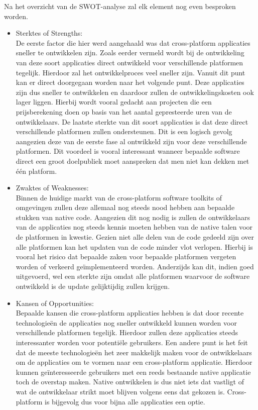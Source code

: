 Na het overzicht van de SWOT-analyse zal elk element nog even besproken worden. 
\begin{itemize}
    \item Sterktes of Strengths:\\
    De eerste factor die hier werd aangehaald was dat cross-platform applicaties sneller te ontwikkelen zijn. Zoals eerder vermeld wordt bij de ontwikkeling van deze soort applicaties direct ontwikkeld voor verschillende platformen tegelijk. Hierdoor zal het ontwikkelproces veel sneller zijn. Vanuit dit punt kan er direct doorgegaan worden naar het volgende punt. Deze applicaties zijn dus sneller te ontwikkelen en daardoor zullen de ontwikkelingskosten ook lager liggen. Hierbij wordt vooral gedacht aan projecten die een prijsberekening doen op basis van het aantal gepresteerde uren van de ontwikkelaars. De laatste sterkte van dit soort applicaties is dat deze direct verschillende platformen zullen ondersteunen. Dit is een logisch gevolg aangezien deze van de eerste fase al ontwikkeld zijn voor deze verschillende platformen. Dit voordeel is vooral interessant wanneer bepaalde software direct een groot doelpubliek moet aanspreken dat men niet kan dekken met één platform.
    \\
    
    \item Zwaktes of Weaknesses:\\
    Binnen de huidige markt van de cross-platform software toolkits of omgevingen zullen deze allemaal nog steeds nood hebben aan bepaalde stukken van native code. Aangezien dit nog nodig is zullen de ontwikkelaars van de applicaties nog steeds kennis moeten hebben van de native talen voor de platformen in kwestie. Gezien niet alle delen van de code gedeeld zijn over alle platformen kan het updaten van de code minder vlot verlopen. Hierbij is vooral het risico dat bepaalde zaken voor bepaalde platformen vergeten worden of verkeerd geïmplementeerd worden. Anderzijds kan dit, indien goed uitgevoerd, wel een sterkte zijn omdat alle platformen waarvoor de software ontwikkeld is de update gelijktijdig zullen krijgen.
    \\
    
    \item Kansen of Opportunities:\\
    Bepaalde kansen die cross-platform applicaties hebben is dat door recente technologieën de applicaties nog sneller ontwikkeld kunnen worden voor verschillende platformen tegelijk. Hierdoor zullen deze applicaties steeds interessanter worden voor potentiële gebruikers. Een andere punt is het feit dat de meeste technologieën het zeer makkelijk maken voor de ontwikkelaars om de applicaties om te vormen naar een cross-platform applicatie. Hierdoor kunnen geïnteresseerde gebruikers met een reeds bestaande native applicatie toch de overstap maken. Native ontwikkelen is dus niet iets dat vastligt of wat de ontwikkelaar strikt moet blijven volgens eens dat gekozen is. Cross-platform is bijgevolg dus voor bijna alle applicaties een optie. 
    \\
    

\end{itemize}
